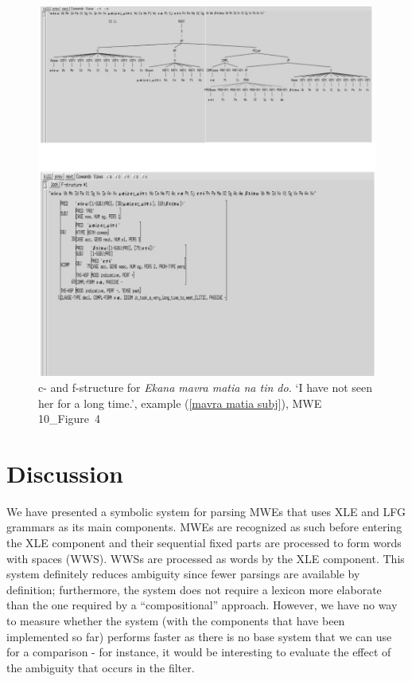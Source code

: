 \documentclass[output=paper,
modfonts
]{langscibook}
\begin{document}
 \begin{figure}[p]%
 \caption{c- and f-structure for \textit{Ekana mavra matia na tin do.} `I have not seen her for a long time.', example (\ref{mavra matia subj}), MWE 10\_Figure~4}
 \centering
 \includegraphics[width=1.\textwidth]{figures/example10a}
 \end{figure}
 

\section{Discussion}
We have presented a symbolic system for parsing MWEs that uses XLE and LFG grammars as its main components. MWEs are recognized as such before entering the XLE component and their sequential fixed parts are processed to form words with spaces (WWS). WWSs are processed as words by the XLE component. This system definitely reduces ambiguity since fewer parsings are available by definition; furthermore, the system does not require a lexicon more elaborate than the one required by a ``compositional” approach. However, we have no way to measure whether the system (with the components that have been implemented so far) performs faster as there is no base system that we can use for a comparison - for instance, it would be interesting to evaluate the effect of the ambiguity that occurs in the filter. 
\end{document}
